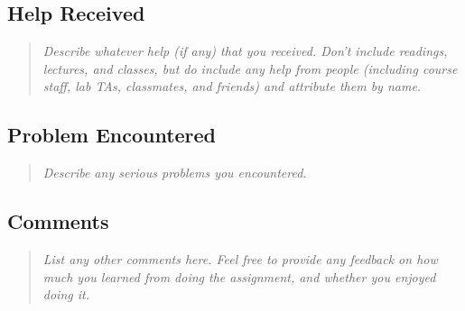 \documentclass[11pt,a4paper,notitlepage]{article}
\newcommand{\explanation}[1]{\begin{quote}\emph{#1} \end{quote}}  %
\begin{document}
\subsection{Help Received}
\explanation{
Describe whatever help (if any) that you received.
Don't include readings, lectures, and classes, but do
include any help from people (including course staff, lab TAs,
classmates, and friends) and attribute them by name.}


\subsection{Problem Encountered}
\explanation{
Describe any serious problems you encountered.                    }



\subsection{Comments}
\explanation{
List any other comments here. Feel free to provide any feedback   
on how much you learned from doing the assignment, and whether    
you enjoyed doing it.}
\end{document}
